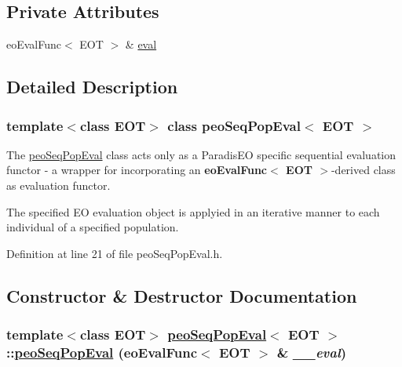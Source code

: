 \subsection*{Private Attributes}
\begin{CompactItemize}
\item 
\hypertarget{classpeoSeqPopEval_5465f31386c6b96bc8f7fb9393a28a2f}{
eo\-Eval\-Func$<$ EOT $>$ \& \hyperlink{classpeoSeqPopEval_5465f31386c6b96bc8f7fb9393a28a2f}{eval}}
\label{classpeoSeqPopEval_5465f31386c6b96bc8f7fb9393a28a2f}

\end{CompactItemize}


\subsection{Detailed Description}
\subsubsection*{template$<$class EOT$>$ class peo\-Seq\-Pop\-Eval$<$ EOT $>$}

The \hyperlink{classpeoSeqPopEval}{peo\-Seq\-Pop\-Eval} class acts only as a Paradis\-EO specific sequential evaluation functor - a wrapper for incorporating an {\bf eo\-Eval\-Func$<$ EOT $>$}-derived class as evaluation functor. 

The specified EO evaluation object is applyied in an iterative manner to each individual of a specified population. 



Definition at line 21 of file peo\-Seq\-Pop\-Eval.h.

\subsection{Constructor \& Destructor Documentation}
\hypertarget{classpeoSeqPopEval_a41f91ab4b2aeb325ff75feb66d4e003}{
\subsubsection[peoSeqPopEval]{\setlength{\rightskip}{0pt plus 5cm}template$<$class EOT$>$ \hyperlink{classpeoSeqPopEval}{peo\-Seq\-Pop\-Eval}$<$ EOT $>$::\hyperlink{classpeoSeqPopEval}{peo\-Seq\-Pop\-Eval} (eo\-Eval\-Func$<$ EOT $>$ \& {\em \_\-\_\-eval})}}
\label{classpeoSeqPopEval_a41f91ab4b2aeb325ff75feb66d4e003}


